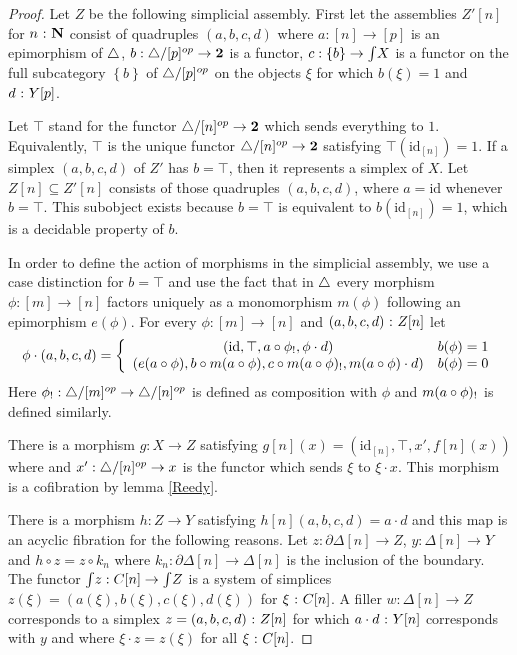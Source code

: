 \documentclass{amsart}
\theoremstyle{plain}
\theoremstyle{definition}
\newcommand\set[1]{\left\{#1\right\}}
\newcommand\id{\mathrm{id}}
\newcommand\sier{{\mathbf 2}}
\begin{document}
\begin{proof} Let $Z$ be the following simplicial assembly. First let the assemblies $Z'[n]$ for $n\mathord{\ :\ }\mathbf N$ consist of quadruples $(a,b,c,d)$ where $a:[n]\to [p]$ is an epimorphism of ${\mathord{\triangle}}$, $b:\simcat/[p]\dual \to \sier$ is a functor, $c:\set b \to \tot X$ is a functor on the full subcategory $\set b$ of ${\mathord{\triangle}}/[p]^{op}$ on the objects $\xi$ for which $b(\xi)=1$ and $d\mathord{\ :\ } Y[p]$. 

Let $\top$ stand for the functor $\simcat/[n]\dual \to \sier$ which sends everything to $1$. Equivalently, $\top$ is the unique functor $\simcat/[n]\dual \to \sier$ satisfying $\top(\id_{[n]})=1$. If a simplex $(a,b,c,d)$ of $Z'$ has $b=\top$, then it represents a simplex of $X$. Let $Z[n]\subseteq Z'[n]$ consists of those quadruples $(a,b,c,d)$, where $a=\id$ whenever $b=\top$. This subobject exists because $b=\top$ is equivalent to $b(\id_{[n]}) = 1$, which is a decidable property of $b$.

In order to define the action of morphisms in the simplicial assembly, we use a case distinction for $b=\top$ and use the fact that in ${\mathord{\triangle}}$ every morphism $\phi:[m]\to[n]$ factors uniquely as a monomorphism $m(\phi)$ following an epimorphism $e(\phi)$. For every $\phi:[m]\to [n]$ and $(a,b,c,d)\mathord{\ :\ } Z[n]$ let
\[ \phi\cdot (a,b,c,d) = \left\{\begin{array}{cc}
(\id,\top,a\circ\phi_\bang,\phi\cdot d) & b(\phi) = 1 \\
(e(a\circ \phi), b\circ m(a\circ \phi), c \circ m(a\circ \phi)_\bang, m(a\circ \phi)\cdot d ) & b(\phi)=0
\end{array}\right.
\]
Here $\phi_!:{\mathord{\triangle}}/[m]^{op} \to {\mathord{\triangle}}/[n]^{op}$ is defined as composition with $\phi$ and $m(a\circ \phi)_!$ is defined similarly.

There is a morphism $g:X\to Z$ satisfying $g[n](x) = (\id_{[n]},\top,x',f[n](x))$ where and $x':{\mathord{\triangle}}/[n]^{op} \to x$ is the functor which sends $\xi$ to $\xi\cdot x$. This morphism is a cofibration by lemma \ref{Reedy}.

There is a morphism $h:Z\to Y$ satisfying $h[n](a,b,c,d) = a\cdot d$ and this map is an acyclic fibration for the following reasons. Let $z:\partial\Delta[n]\to Z$, $y:\Delta[n]\to Y$ and $h\circ z = z\circ k_n$ where $k_n:\partial\Delta[n]\to \Delta[n]$ is the inclusion of the boundary. The functor $\mathord{\int} z: C[n]\to \mathord{\int} Z$ is a system of simplices $z(\xi) = (a(\xi),b(\xi),c(\xi),d(\xi))$ for $\xi\mathord{\ :\ } C[n]$. A filler $w:\Delta[n]\to Z$ corresponds to a simplex $z=(a,b,c,d)\mathord{\ :\ } Z[n]$ for which $a\cdot d\mathord{\ :\ } Y[n]$ corresponds with $y$ and where $\xi\cdot z=z(\xi)$ for all $\xi\mathord{\ :\ } C[n]$. 


\end{proof}
\end{document}
